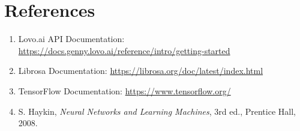 \documentclass[12pt]{article}
\begin{document}
\section*{References}

\begin{enumerate}
    \item Lovo.ai API Documentation: \url{https://docs.genny.lovo.ai/reference/intro/getting-started}
    \item Librosa Documentation: \url{https://librosa.org/doc/latest/index.html}
    \item TensorFlow Documentation: \url{https://www.tensorflow.org/}
    \item S. Haykin, \textit{Neural Networks and Learning Machines}, 3rd ed., Prentice Hall, 2008.
\end{enumerate}
\end{document}
